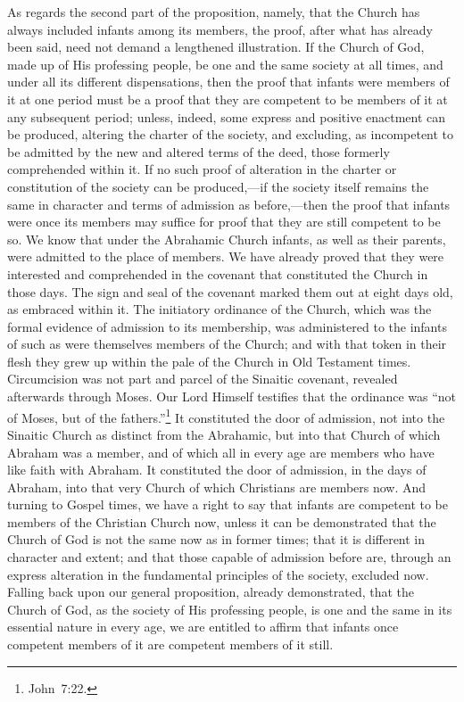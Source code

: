 \documentclass[
]{book}
\begin{document}
As regards the second part of the proposition, namely, that the Church has always included infants among its members, the proof, after what has already been said, need not demand a lengthened illustration. If the Church of God, made up of His professing people, be one and the same society at all times, and under all its different dispensations, then the proof that infants were members of it at one period must be a proof that they are competent to be members of it at any subsequent period; unless, indeed, some express and positive enactment can be produced, altering the charter of the society, and excluding, as incompetent to be admitted by the new and altered terms of the deed, those formerly comprehended within it. If no such proof of alteration in the charter or constitution of the society can be produced,---if the society itself remains the same in character and terms of admission as before,---then the proof that infants were once its members may suffice for proof that they are still competent to be so. We know that under the Abrahamic Church infants, as well as their parents, were admitted to the place of members. We have already proved that they were interested and comprehended in the covenant that constituted the Church in those days. The sign and seal of the covenant marked them out at eight days old, as embraced within it. The initiatory ordinance of the Church, which was the formal evidence of admission to its membership, was administered to the infants of such as were themselves members of the Church; and with that token in their flesh they grew up within the pale of the Church in Old Testament times. Circumcision was not part and parcel of the Sinaitic covenant, revealed afterwards through Moses. Our Lord Himself testifies that the ordinance was ``not of Moses, but of the fathers.''\footnote{John~7:22.} It constituted the door of admission, not into the Sinaitic Church as distinct from the Abrahamic, but into that Church of which Abraham was a member, and of which all in every age are members who have like faith with Abraham. It constituted the door of admission, in the days of Abraham, into that very Church of which Christians are members now. And turning to Gospel times, we have a right to say that infants are competent to be members of the Christian Church now, unless it can be demonstrated that the Church of God is not the same now as in former times; that it is different in character and extent; and that those capable of admission before are, through an express alteration in the fundamental principles of the society, excluded now. Falling back upon our general proposition, already demonstrated, that the Church of God, as the society of His professing people, is one and the same in its essential nature in every age, we are entitled to affirm that infants once competent members of it are competent members of it still.
\end{document}
